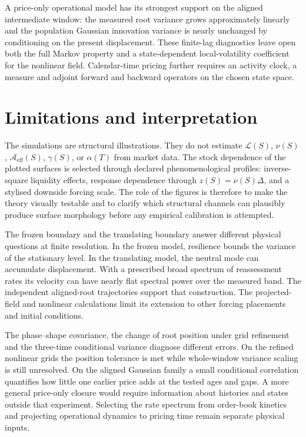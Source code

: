 \documentclass[11pt]{article}
\newcommand{\Aeff}{\mathcal A_{\mathrm{eff}}}
\newcommand{\Liq}{\mathcal L}
\begin{document}
A price-only operational model has its strongest support on the aligned
intermediate window: the measured root variance grows approximately
linearly and the population Gaussian innovation variance is nearly
unchanged by conditioning on the present displacement. These finite-lag
diagnostics leave open both the full Markov property and a
state-dependent local-volatility coefficient for the nonlinear field.
Calendar-time pricing further requires an activity clock, a measure and
adjoint forward and backward operators on the chosen state space.
\FloatBarrier

\section{Limitations and interpretation}

The simulations are structural illustrations. They do not estimate
\(\Liq(S)\), \(\nu(S)\), \(\Aeff(S)\), \(\gamma(S)\), or \(\alpha(T)\) from
market data. The stock dependence of the plotted surfaces is selected through
declared phenomenological profiles: inverse-square liquidity effects,
response dependence through \(z(S)=\nu(S)\Delta\), and a stylised downside
forcing scale. The role of the figures is therefore to make the theory
visually testable and to clarify which structural channels can plausibly
produce surface morphology before any empirical calibration is attempted.

The frozen boundary and the translating boundary answer different physical
questions at finite resolution. In the frozen model, resilience bounds
the variance of the stationary level. In the translating model, the
neutral mode can accumulate displacement. With a prescribed broad spectrum
of reassessment rates its velocity can have nearly flat spectral power
over the measured band. The independent aligned-root trajectories support
that construction. The projected-field and nonlinear calculations limit
its extension to other forcing placements and initial conditions.

The phase--shape covariance, the change of root position under grid
refinement and the three-time conditional variance diagnose different
errors. On the refined nonlinear grids the position tolerance is met
while whole-window variance scaling is still unresolved. On the aligned
Gaussian family a small conditional correlation quantifies how little
one earlier price adds at the tested ages and gaps. A more general
price-only closure would require information about histories and states
outside that experiment. Selecting the rate spectrum from order-book
kinetics and projecting operational dynamics to pricing time remain
separate physical inputs.
\end{document}
